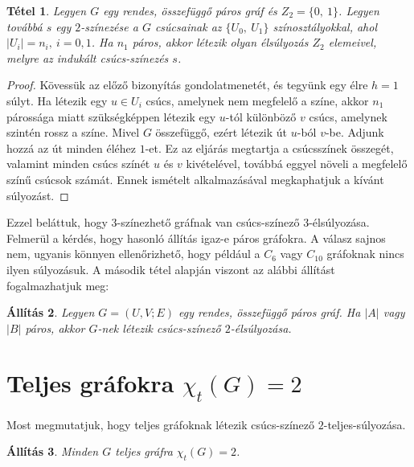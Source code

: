\documentclass[12pt, a4paper]{report}
\newtheorem{tét}{Tétel}[section]
\newtheorem{áll}[tét]{Állítás}
\theoremstyle{remark}
\theoremstyle{definition}
\begin{document}
\begin{tét}
Legyen $G$ egy rendes, összefüggő páros gráf és $Z_2 = \lbrace 0,\ 1 \rbrace$. Legyen továbbá $s$ egy $2$-színezése a $G$ csúcsainak az $\lbrace U_0,\ U_1 \rbrace$ színosztályokkal, ahol $|U_i| = n_i,\ i = 0, 1$. Ha $n_1$ páros, akkor létezik olyan élsúlyozás $Z_2$ elemeivel, melyre az indukált csúcs-színezés $s$.
\end{tét}

\begin{proof}
Kövessük az előző bizonyítás gondolatmenetét, és tegyünk egy élre $h = 1$ súlyt. Ha létezik egy $u \in U_i$ csúcs, amelynek nem megfelelő a színe, akkor $n_1$ párossága miatt szükségképpen létezik egy $u$-tól különböző $v$ csúcs, amelynek szintén rossz a színe. Mivel $G$ összefüggő, ezért létezik út $u$-ból $v$-be. Adjunk hozzá az út minden éléhez $1$-et. Ez az eljárás megtartja a csúcsszínek összegét, valamint minden csúcs színét $u$ és $v$ kivételével, továbbá eggyel növeli a megfelelő színű csúcsok számát. Ennek ismételt alkalmazásával megkaphatjuk a kívánt súlyozást.
\end{proof}

Ezzel beláttuk, hogy $3$-színezhető gráfnak van csúcs-színező $3$-élsúlyozása. Felmerül a kérdés, hogy hasonló állítás igaz-e páros gráfokra. A válasz sajnos nem, ugyanis könnyen ellenőrizhető, hogy például a $C_6$ vagy $C_{10}$ gráfoknak nincs ilyen súlyozásuk. A második tétel alapján viszont az alábbi állítást fogalmazhatjuk meg:

\begin{áll}
Legyen $G = (U, V; E)$ egy rendes, összefüggő páros gráf. Ha $|A|$ vagy $|B|$ páros, akkor $G$-nek létezik csúcs-színező $2$-élsúlyozása.
\end{áll}

\section{Teljes gráfokra $χ_t(G) = 2$}
Most megmutatjuk, hogy teljes gráfoknak létezik csúcs-színező $2$-teljes-súlyozása.

\begin{áll}
Minden $G$ teljes gráfra $\chi_t(G) = 2$.
\end{áll}
\end{document}
